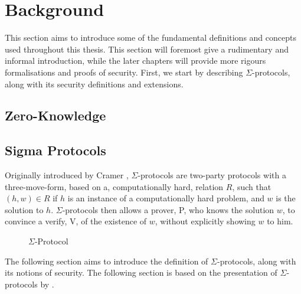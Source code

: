 \chapter{Background}
\label{ch:background}
This section aims to introduce some of the fundamental definitions and concepts
used throughout this thesis. This section will foremost give a rudimentary and
informal introduction, while the later chapters will provide more rigours
formalisations and proofs of security.
First, we start by describing $\Sigma$-protocols, along with its security
definitions and extensions.

\section{Zero-Knowledge}
\label{sec:background:zk}


\section{Sigma Protocols}
\label{sec:background:sigma_protocols}
Originally introduced by Cramer , $\Sigma$-protocols are two-party protocols with a
three-move-form, based on a, computationally hard, relation $R$, such that $(h, w) \in R$
if $h$ is an instance of a computationally hard problem, and $w$ is
the solution to $h$. $\Sigma$-protocols then allows a prover, P, who knows the
solution $w$, to convince a verify, V, of the existence of $w$, without
explicitly showing $w$ to him.

\begin{figure}[ht]
  \centering
  \caption{\label{fig:proto_sigma} $\Sigma$-Protocol}
\end{figure}


The following section aims to introduce the definition of $\Sigma$-protocols,
along with its notions of security. The following section is based on the
presentation of $\Sigma$-protocols by \citet{on-sigma-protocols}.

